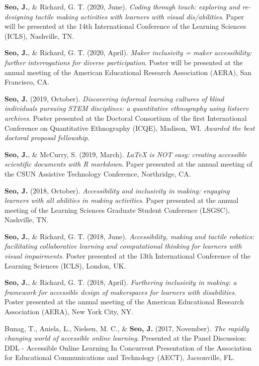 \documentclass[11pt, a4paper]{awesome-cv}
\begin{document}
\begingroup
\setlength{\parindent}{-0.5in}
\setlength{\leftskip}{0.5in}

\textbf{Seo, J.}, \& Richard, G. T. (2020, June). \emph{Coding through touch: exploring and re-designing tactile making activities with learners with visual dis/abilities}. Paper will be presented at the 14th International Conference of the Learning Sciences (ICLS), Nashville, TN.

\textbf{Seo, J.}, \& Richard, G. T. (2020, April). \emph{Maker inclusivity = maker accessibility: further interrogations for diverse participation}. Poster will be presented at the annual meeting of the American Educational Research Association (AERA), San Francisco, CA.

\textbf{Seo, J.} (2019, October). \emph{Discovering informal learning cultures of blind individuals pursuing STEM disciplines: a quantitative ethnography using listserv archives}. Poster presented at the Doctoral Consortium of the first International Conference on Quantitative Ethnography (ICQE), Madison, WI. \emph{Awarded the best doctoral proposal fellowship}.

\textbf{Seo, J.}, \& McCurry, S. (2019, March). \emph{LaTeX is NOT easy: creating accessible scientific documents with R markdown}. Paper presented at the annual meeting of the CSUN Assistive Technology Conference, Northridge, CA.

\textbf{Seo, J.} (2018, October). \emph{Accessibility and inclusivity in making: engaging learners with all abilities in making activities}. Paper presented at the annual meeting of the Learning Sciences Graduate Student Conference (LSGSC), Nashville, TN.

\textbf{Seo, J.}, \& Richard, G. T. (2018, June). \emph{Accessibility, making and tactile robotics: facilitating collaborative learning and computational thinking for learners with visual impairments}. Poster presented at the 13th International Conference of the Learning Sciences (ICLS), London, UK.

\textbf{Seo, J.}, \& Richard, G. T. (2018, April). \emph{Furthering inclusivity in making: a framework for accessible design of makerspaces for learners with disabilities}. Poster presented at the annual meeting of the American Educational Research Association (AERA), New York City, NY.

Bunag, T., Aniela, L., Nielsen, M. C., \& \textbf{Seo, J.} (2017, November). \emph{The rapidly changing world of accessible online learning}. Presented at the Panel Discussion: DDL - Accessible Online Learning In Concurrent Presentation of the Association for Educational Communications and Technology (AECT), Jacsonville, FL.
\end{document}

